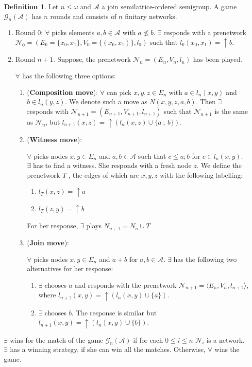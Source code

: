 \documentclass[a4paper]{article}
\theoremstyle{definition}
\newtheorem{definition}{Definition}
\theoremstyle{theorem}
\theoremstyle{proposition}
\theoremstyle{lemma}
\theoremstyle{ex}
\theoremstyle{corollary}
\theoremstyle{claim}
\begin{document}
\begin{definition}
  Let $n \leq \omega$ and $\mathcal{A}$ a join semilattice-ordered semigroup. A game $\mathcal{G}_n(\mathcal{A})$ has $n$ rounds and consists of $n$ finitary networks.

  \begin{enumerate}
    \item Round $0$: $\forall$ picks elements $a, b \in \mathcal{A}$ with $a \not\leq b$. $\exists$ responds with a prenetwork $\mathcal{N}_0 = (E_0 = \{ x_0, x_1 \}, V_0 = \{ (x_0, x_1)\}, l_0)$ such that $l_0(x_0, x_1) = \uparrow b$.
    \item Round $n + 1$. Suppose, the prenetwork $\mathcal{N}_n = (E_n, V_n, l_n)$ has been played.

    $\forall$ has the following three options:
    \begin{enumerate}
      \item ({\bf Composition move}): $\forall$ can pick $x, y, z \in E_n$ with $a \in l_n(x, y)$ and $b \in l_n(y, z)$. We denote such a move as $N(x,y,z,a,b)$. Then $\exists$ responds with $\mathcal{N}_{n + 1} = (E_{n + 1}, V_{n + 1}, l_{n + 1})$ such that $\mathcal{N}_{n + 1}$
      is the same as $\mathcal{N}_n$, but $l_{n + 1}(x, z) = \uparrow (l_{n}(x, z) \cup \{ a \: ; \: b\})$.
      \item ({\bf Witness move}):

      $\forall$ picks nodes $x, y \in E_n$ and $a, b \in \mathcal{A}$ such that $c \leq a ; b$ for $c \in l_n(x, y)$. $\exists$ has to find a witness. She responds with a fresh node $z$. We define the prenetwork $T$ , the edges of which are $x, y, z$ with the following labelling:
      \begin{enumerate}
        \item $l_T(x, z) = \uparrow a$
        \item $l_T(z, y) = \uparrow b$
      \end{enumerate}
      For her response, $\exists$ plays $N_{n + 1} = N_n \cup T$
      \item ({\bf Join move}):

      $\forall$ picks nodes $x, y \in E_n$ and $a + b$ for $a, b \in \mathcal{A}$. $\exists$ has the following two alternatives for her response:
      \begin{enumerate}
        \item $\exists$ chooses $a$ and responds with the prenetwork $\mathcal{N}_{n + 1} = \langle E_n, V_{n}, l_{n + 1} \rangle$, where $l_{n+1}(x, y) = \uparrow (l_n(x,y) \cup \{ a \})$.
        \item $\exists$ chooses $b$. The response is similar but $l_{n + 1}(x, y) = \uparrow (l_n(x,y) \cup \{ b \})$.
      \end{enumerate}
    \end{enumerate}
  \end{enumerate}

  $\exists$ wins for the match of the game $\mathcal{G}_n(\mathcal{A})$ if for each $0 \leq i \leq n$ $\mathcal{N}_i$ is a network. $\exists$ has a winning strategy, if she can win all the matches. Otherwise, $\forall$ wins the game.
\end{definition}
\end{document}
